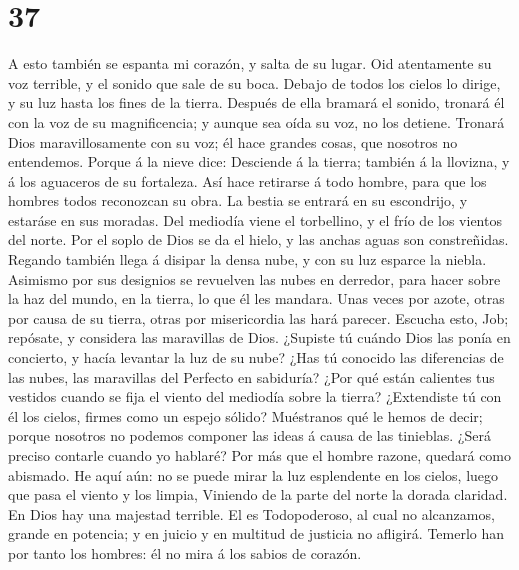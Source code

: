 \hypertarget{section-36}{%
\section{37}\label{section-36}}

 A esto también se espanta mi corazón, y salta de su lugar.
 Oid atentamente su voz terrible, y el sonido que sale de su
boca.  Debajo de todos los cielos lo dirige, y su luz hasta
los fines de la tierra.  Después de ella bramará el sonido,
tronará él con la voz de su magnificencia; y aunque sea oída su voz, no
los detiene.  Tronará Dios maravillosamente con su voz; él
hace grandes cosas, que nosotros no entendemos.  Porque á la
nieve dice: Desciende á la tierra; también á la llovizna, y á los
aguaceros de su fortaleza.  Así hace retirarse á todo
hombre, para que los hombres todos reconozcan su obra.  La
bestia se entrará en su escondrijo, y estaráse en sus moradas.
 Del mediodía viene el torbellino, y el frío de los vientos
del norte.  Por el soplo de Dios se da el hielo, y las
anchas aguas son constreñidas.  Regando también llega á
disipar la densa nube, y con su luz esparce la niebla. 
Asimismo por sus designios se revuelven las nubes en derredor, para
hacer sobre la haz del mundo, en la tierra, lo que él les mandara.
 Unas veces por azote, otras por causa de su tierra, otras
por misericordia las hará parecer.  Escucha esto, Job;
repósate, y considera las maravillas de Dios.  ¿Supiste tú
cuándo Dios las ponía en concierto, y hacía levantar la luz de su nube?
 ¿Has tú conocido las diferencias de las nubes, las
maravillas del Perfecto en sabiduría?  ¿Por qué están
calientes tus vestidos cuando se fija el viento del mediodía sobre la
tierra?  ¿Extendiste tú con él los cielos, firmes como un
espejo sólido?  Muéstranos qué le hemos de decir; porque
nosotros no podemos componer las ideas á causa de las tinieblas.
 ¿Será preciso contarle cuando yo hablaré? Por más que el
hombre razone, quedará como abismado.  He aquí aún: no se
puede mirar la luz esplendente en los cielos, luego que pasa el viento y
los limpia,  Viniendo de la parte del norte la dorada
claridad. En Dios hay una majestad terrible.  El es
Todopoderoso, al cual no alcanzamos, grande en potencia; y en juicio y
en multitud de justicia no afligirá.  Temerlo han por tanto
los hombres: él no mira á los sabios de corazón.

